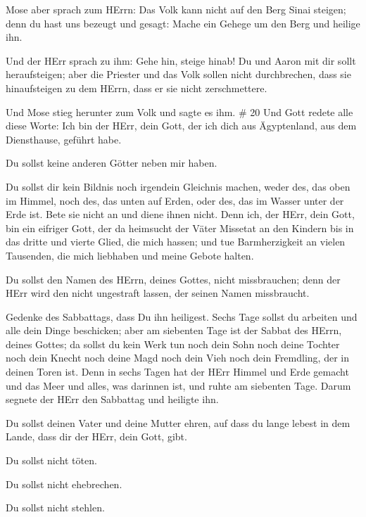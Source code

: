  Mose aber sprach zum HErrn: Das Volk kann nicht auf den
Berg Sinai steigen; denn du hast uns bezeugt und gesagt: Mache ein
Gehege um den Berg und heilige ihn.

 Und der HErr sprach zu ihm: Gehe hin, steige hinab! Du und
Aaron mit dir sollt heraufsteigen; aber die Priester und das Volk sollen
nicht durchbrechen, dass sie hinaufsteigen zu dem HErrn, dass er sie
nicht zerschmettere.

 Und Mose stieg herunter zum Volk und sagte es ihm. \# 20
 Und Gott redete alle diese Worte:  Ich bin der
HErr, dein Gott, der ich dich aus Ägyptenland, aus dem Diensthause,
geführt habe.

 Du sollst keine anderen Götter neben mir haben.

 Du sollst dir kein Bildnis noch irgendein Gleichnis machen,
weder des, das oben im Himmel, noch des, das unten auf Erden, oder des,
das im Wasser unter der Erde ist.  Bete sie nicht an und
diene ihnen nicht. Denn ich, der HErr, dein Gott, bin ein eifriger Gott,
der da heimsucht der Väter Missetat an den Kindern bis in das dritte und
vierte Glied, die mich hassen;  und tue Barmherzigkeit an
vielen Tausenden, die mich liebhaben und meine Gebote halten.

 Du sollst den Namen des HErrn, deines Gottes, nicht
missbrauchen; denn der HErr wird den nicht ungestraft lassen, der seinen
Namen missbraucht.

 Gedenke des Sabbattags, dass Du ihn heiligest. 
Sechs Tage sollst du arbeiten und alle dein Dinge beschicken;
 aber am siebenten Tage ist der Sabbat des HErrn, deines
Gottes; da sollst du kein Werk tun noch dein Sohn noch deine Tochter
noch dein Knecht noch deine Magd noch dein Vieh noch dein Fremdling, der
in deinen Toren ist.  Denn in sechs Tagen hat der HErr
Himmel und Erde gemacht und das Meer und alles, was darinnen ist, und
ruhte am siebenten Tage. Darum segnete der HErr den Sabbattag und
heiligte ihn.

 Du sollst deinen Vater und deine Mutter ehren, auf dass du
lange lebest in dem Lande, dass dir der HErr, dein Gott, gibt.

 Du sollst nicht töten.

 Du sollst nicht ehebrechen.

 Du sollst nicht stehlen.

